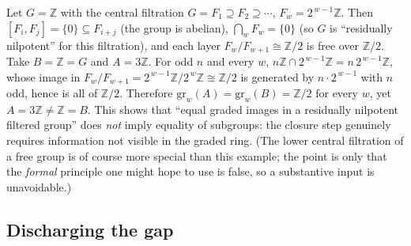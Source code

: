 \documentclass{amsart}
\theoremstyle{definition}
\theoremstyle{remark}
\begin{document}
\begin{example}\label{ex:Z}
Let $G=\mathbb Z$ with the central filtration $G=F_1\supseteq F_2\supseteq\cdots$,
$F_w=2^{\,w-1}\mathbb Z$. Then $[F_i,F_j]=\{0\}\subseteq F_{i+j}$ (the group is
abelian), $\bigcap_w F_w=\{0\}$ (so $G$ is ``residually nilpotent'' for this
filtration), and each layer $F_w/F_{w+1}\cong\mathbb Z/2$ is free over
$\mathbb Z/2$. Take $B=\mathbb Z=G$ and $A=3\mathbb Z$. For odd $n$ and every $w$,
$n\mathbb Z\cap 2^{\,w-1}\mathbb Z=n\,2^{\,w-1}\mathbb Z$, whose image in
$F_w/F_{w+1}=2^{\,w-1}\mathbb Z/2^{\,w}\mathbb Z\cong\mathbb Z/2$ is generated by
$n\cdot 2^{\,w-1}$ with $n$ odd, hence is all of $\mathbb Z/2$. Therefore
$\mathrm{gr}_w(A)=\mathrm{gr}_w(B)=\mathbb Z/2$ for every $w$, yet $A=3\mathbb Z\ne\mathbb Z=B$.
This shows that ``equal graded images in a residually nilpotent filtered group''
does \emph{not} imply equality of subgroups: the closure step genuinely requires
information not visible in the graded ring. (The lower central filtration of a free
group is of course more special than this example; the point is only that the
\emph{formal} principle one might hope to use is false, so a substantive input is
unavoidable.)
\end{example}

\subsection{Discharging the gap}\label{sub:discharge}
\end{document}
